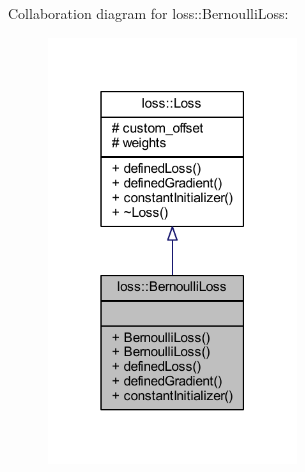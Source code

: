 Collaboration diagram for loss\+:\+:Bernoulli\+Loss\+:
\nopagebreak
\begin{figure}[H]
\begin{center}
\leavevmode
\includegraphics[width=187pt]{classloss_1_1_bernoulli_loss__coll__graph}
\end{center}
\end{figure}
